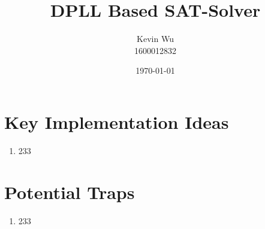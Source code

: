 \documentclass[a4paper,12pt]{article}
\title{DPLL Based SAT-Solver}
\author{Kevin Wu\\1600012832}
\date{\today}
\begin{document}
\maketitle
\section{Key Implementation Ideas}
\begin{enumerate}
    \item 233
\end{enumerate}
\section{Potential Traps}
\begin{enumerate}
    \item 233
\end{enumerate}
\end{document}
